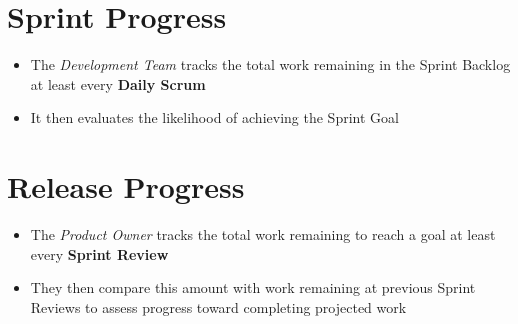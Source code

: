 \documentclass[a4paper,11pt,twocolumn]{article}
\begin{document}
\section*{Sprint Progress}
\begin{itemize}
    \item The \textit{Development Team} tracks the total work remaining in the Sprint Backlog at least every \textbf{Daily Scrum}
    \item It then evaluates the likelihood of achieving the Sprint Goal
\end{itemize}

\section*{Release Progress}
\begin{itemize}
    \item The \textit{Product Owner} tracks the total work remaining to reach a goal at least every \textbf{Sprint Review}
    \item They then compare this amount with work remaining at previous Sprint Reviews to assess progress toward completing projected work
\end{itemize}

\nocite{*}


\end{document}
